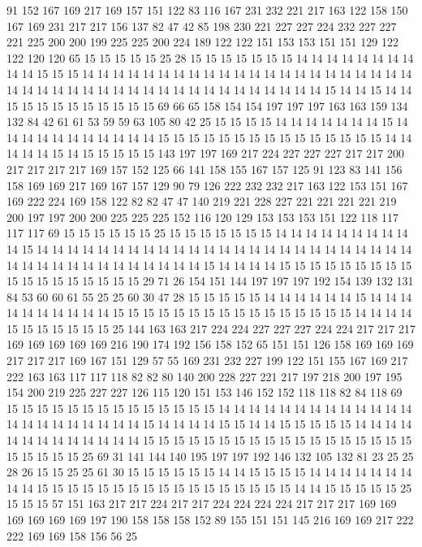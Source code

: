 91 152 167 169 217 169 157 151 122 83 116 167 231 232 221 217 163 122 158 150
167 169 231 217 217 156 137 82 47 42 85 198 230 221 227 227 224 232 227 227
221 225 200 200 199 225 225 200 224 189 122 122 151 153 153 151 151 129 122 122
120 120 65 15 15 15 15 15 25 28 15 15 15 15 15 15 15 14 14 14
14 14 14 14 14 14 14 15 15 15 14 14 14 14 14 14 14 14 14 14
14 14 14 14 14 14 14 14 14 14 14 14 14 14 14 14 14 14 14 14
14 14 14 14 14 14 14 14 14 14 14 14 14 15 14 14 15 14 14 15
15 15 15 15 15 15 15 15 15 69 66 65 158 154 154 197 197 197 163 163
159 134 132 84 42 61 61 53 59 59 63 105 80 42 25 15 15 15 15 14
14 14 14 14 14 14 15 14 14 14 14 14 14 14 14 14 14 14 15 15
15 15 15 15 15 15 15 15 15 15 15 15 15 14 14 14 14 14 15 14
15 15 15 15 15 143 197 197 169 217 224 227 227 227 217 217 200 217 217 217
217 169 157 152 125 66 141 158 155 167 157 125 91 123 83 141 156 158 169 169
217 169 167 157 129 90 79 126 222 232 232 217 163 122 153 151 167 169 222 224
169 158 122 82 82 47 47 140 219 221 228 227 221 221 221 221 219 200 197 197
200 200 225 225 225 152 116 120 129 153 153 153 151 122 118 117 117 117 69 15
15 15 15 15 15 25 15 15 15 15 15 15 15 14 14 14 14 14 14 14
14 14 14 15 14 14 14 14 14 14 14 14 14 14 14 14 14 14 14 14
14 14 14 14 14 14 14 14 14 14 14 14 14 14 14 14 14 14 14 14
14 14 15 14 14 14 14 15 15 15 15 15 15 15 15 15 15 15 15 15
15 15 15 15 15 29 71 26 154 151 144 197 197 197 192 154 139 132 131 84
53 60 60 61 55 25 25 60 30 47 28 15 15 15 15 15 14 14 14 14
14 14 15 14 14 14 14 14 14 14 14 14 14 15 15 15 15 15 15 15
15 15 15 15 15 15 15 15 15 14 14 14 14 15 15 15 15 15 15 15
25 144 163 163 217 224 224 227 227 227 224 224 217 217 217 169 169 169 169 169
216 190 174 192 156 158 152 65 151 151 126 158 169 169 169 217 217 217 169 167
151 129 57 55 169 231 232 227 199 122 151 155 167 169 217 222 163 163 117 117
118 82 82 80 140 200 228 227 221 217 197 218 200 197 195 154 200 219 225 227
227 126 115 120 151 153 146 152 152 118 118 82 84 118 69 15 15 15 15 15
15 15 15 15 15 15 15 15 15 14 14 14 14 14 14 14 14 14 14 14
14 14 14 14 14 14 14 14 14 14 14 15 14 14 14 14 15 15 14 14
15 15 15 15 15 14 14 14 14 14 14 14 14 14 14 14 14 14 15 15
15 15 15 15 15 15 15 15 15 15 15 15 15 15 15 15 15 15 15 15
15 25 69 31 141 144 140 195 197 197 192 146 132 105 132 81 23 25 25 28
26 15 15 25 25 61 30 15 15 15 15 15 15 14 14 15 15 15 15 14
14 14 14 14 14 14 14 14 15 15 15 15 15 15 15 15 15 15 15 15
15 15 15 15 15 14 14 15 15 15 15 15 25 15 15 15 57 151 163 217
217 224 217 217 224 224 224 224 217 217 217 169 169 169 169 169 169 197 190 158
158 158 152 89 155 151 151 145 216 169 169 217 222 222 169 169 158 156 56 25
